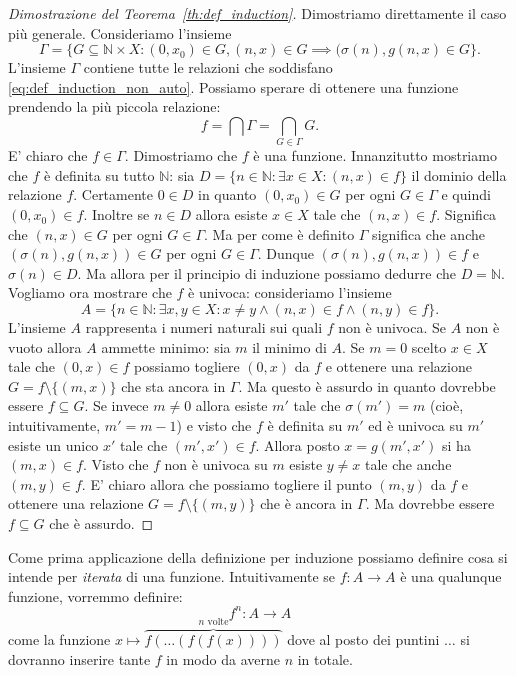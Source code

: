 \documentclass[italian,a4paper,twosides,headinclude]{scrbook}
\renewcommand{\subset}{\subseteq}
\newcommand{\NN}{\mathbb N}
\begin{document}
\begin{proof}[Dimostrazione del Teorema~\ref{th:def_induction}]
Dimostriamo direttamente il caso più generale. Consideriamo
l'insieme
\[
  \Gamma = \{ G \subset \NN \times X\colon (0,x_0)\in G,
  (n,x)\in G \implies (\sigma(n), g(n, x)\in G\}.
\]
L'insieme $\Gamma$ contiene tutte le relazioni che soddisfano  \eqref{eq:def_induction_non_auto}. Possiamo sperare di ottenere una funzione
prendendo la più piccola relazione:
\[
   f = \bigcap \Gamma = \bigcap_{G\in \Gamma} G.
\]
E' chiaro che $f\in \Gamma$.
Dimostriamo che $f$ è una funzione. Innanzitutto mostriamo che $f$ è definita su tutto $\NN$: sia $D=\{n\in \NN \colon \exists x\in X \colon (n,x)\in f\}$ il dominio della relazione $f$. Certamente $0\in D$ in quanto $(0,x_0)\in G$ per ogni $G\in \Gamma$ e quindi $(0,x_0)\in f$. Inoltre se $n\in D$ allora esiste $x\in X$ tale che $(n,x)\in f$. Significa che $(n,x)\in G$ per ogni $G\in \Gamma$. Ma per come è definito $\Gamma$ significa che anche $(\sigma(n),g(n,x))\in G$ per ogni $G\in \Gamma$. Dunque $(\sigma(n),g(n,x))\in f$ e $\sigma(n)\in D$. Ma allora per il principio di induzione possiamo dedurre che $D=\NN$. Vogliamo ora mostrare che $f$ è univoca: consideriamo l'insieme
\[
  A = \{n\in \NN \colon \exists x,y\in X \colon x \neq y \land (n,x)\in f \land (n,y) \in f\}.
\]
L'insieme $A$ rappresenta i numeri naturali sui quali $f$ non è univoca.
Se $A$ non è vuoto allora $A$ ammette minimo: sia $m$ il minimo di $A$.
Se $m=0$ scelto $x\in X$ tale che $(0,x)\in f$ possiamo togliere $(0,x)$ da $f$ e ottenere una relazione $G=f\setminus\{(m,x)\}$ che sta ancora in $\Gamma$.
Ma questo è assurdo in quanto dovrebbe essere $f\subset G$. Se invece $m\neq 0$ allora esiste $m'$ tale che $\sigma(m')=m$ (cioè, intuitivamente, $m'=m-1$) e visto che $f$ è definita su $m'$ ed è univoca su $m'$ esiste un unico $x'$ tale che $(m',x')\in f$. Allora posto $x=g(m',x')$ si ha $(m,x)\in f$. Visto che $f$ non è univoca su $m$ esiste $y\neq x$ tale che anche $(m,y)\in f$. E' chiaro allora che possiamo togliere il punto $(m,y)$ da $f$ e ottenere una relazione $G=f \setminus\{(m,y)\}$ che è ancora in $\Gamma$. Ma dovrebbe essere $f\subset G$ che è assurdo.
\end{proof}

Come prima applicazione della definizione per induzione possiamo definire cosa si intende per \emph{iterata} di una funzione. Intuitivamente se $f\colon A \to A$ è una qualunque funzione, vorremmo definire:
\[
  f^n \colon A \to A
\]
come la funzione $x \mapsto \overbrace{f( \dots (f(f(x))))}^{\text{$n$ volte}}$ dove al posto dei puntini $\dots$ si dovranno inserire tante $f$ in modo da averne $n$ in totale.
\end{document}
